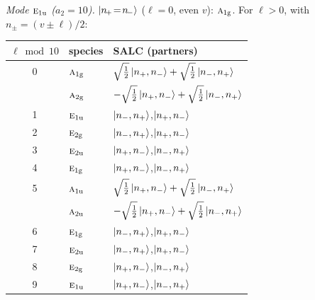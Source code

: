 \documentclass[11pt]{article}
\newcommand{\irr}[1]{\text{\normalfont\scshape #1}}
\newcommand{\ptag}[1]{\mathrm{#1}}
\begin{document}
\emph{Mode $\irr{e}_{1\ptag{u}}$ ($a_2=10$).} $\ket{n_{\!+}\!=\!n_{\!-}}$ ($\ell=0$, even $v$): $\irr{a}_{1\ptag{g}}$. For $\ell>0$, with $n_\pm=(v\pm\ell)/2$:
\begin{longtable}{c l l}\hline $\ell\bmod 10$ & species & SALC (partners)\\ \hline\endhead
0 & $\irr{a}_{1\ptag{g}}$ & $\sqrt{\tfrac{1}{2}}\ket{n_+,n_-}+\sqrt{\tfrac{1}{2}}\ket{n_-,n_+}$\\
 & $\irr{a}_{2\ptag{g}}$ & $-\sqrt{\tfrac{1}{2}}\ket{n_+,n_-}+\sqrt{\tfrac{1}{2}}\ket{n_-,n_+}$\\
1 & $\irr{e}_{1\ptag{u}}$ & $\ket{n_-,n_+}$,\quad $\ket{n_+,n_-}$\\
2 & $\irr{e}_{2\ptag{g}}$ & $\ket{n_-,n_+}$,\quad $\ket{n_+,n_-}$\\
3 & $\irr{e}_{2\ptag{u}}$ & $\ket{n_+,n_-}$,\quad $\ket{n_-,n_+}$\\
4 & $\irr{e}_{1\ptag{g}}$ & $\ket{n_+,n_-}$,\quad $\ket{n_-,n_+}$\\
5 & $\irr{a}_{1\ptag{u}}$ & $\sqrt{\tfrac{1}{2}}\ket{n_+,n_-}+\sqrt{\tfrac{1}{2}}\ket{n_-,n_+}$\\
 & $\irr{a}_{2\ptag{u}}$ & $-\sqrt{\tfrac{1}{2}}\ket{n_+,n_-}+\sqrt{\tfrac{1}{2}}\ket{n_-,n_+}$\\
6 & $\irr{e}_{1\ptag{g}}$ & $\ket{n_-,n_+}$,\quad $\ket{n_+,n_-}$\\
7 & $\irr{e}_{2\ptag{u}}$ & $\ket{n_-,n_+}$,\quad $\ket{n_+,n_-}$\\
8 & $\irr{e}_{2\ptag{g}}$ & $\ket{n_+,n_-}$,\quad $\ket{n_-,n_+}$\\
9 & $\irr{e}_{1\ptag{u}}$ & $\ket{n_+,n_-}$,\quad $\ket{n_-,n_+}$\\
\hline\end{longtable}
\end{document}
